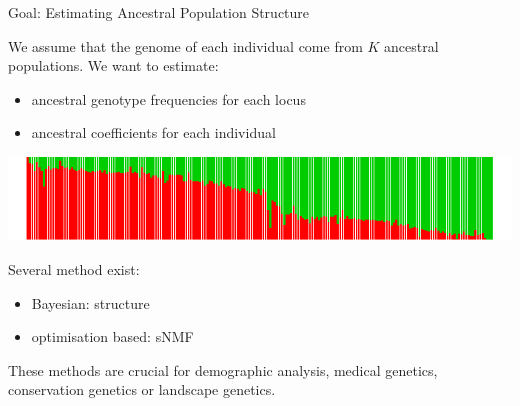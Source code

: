 \documentclass{beamer}\usepackage[]{graphicx}\usepackage[]{color}
\begin{document}
\begin{frame}{Goal: Estimating Ancestral Population Structure}

We assume that the genome of each individual come from $K$ ancestral populations. 
We want to estimate: 
\begin{itemize}
  \item \alert{ancestral genotype frequencies} for each locus
  \item \alert{ancestral coefficients} for each individual
\end{itemize}


\includegraphics{barplot.pdf}


Several method exist:
\begin{itemize}
  \item \alert{Bayesian}: structure~\citep{pritchard2000inference}
  \item \alert{optimisation based}: sNMF~\citep{frichot2014fast}
\end{itemize}
These methods are crucial for demographic analysis, medical genetics, 
  conservation genetics or landscape genetics.
\end{frame}
\end{document}
